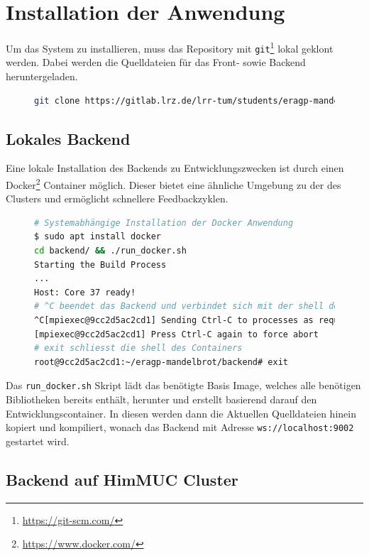 \section{Installation der Anwendung}

Um das System zu installieren, muss das Repository mit \verb|git|\footnote{\url{https://git-scm.com/}} lokal geklont werden. Dabei werden die Quelldateien für
das Front- sowie Backend heruntergeladen.

\begin{figure}[h!]
	\begin{lstlisting}[language=bash, caption={Klonen des Repositorys}]
git clone https://gitlab.lrz.de/lrr-tum/students/eragp-mandelbrot.git
        \end{lstlisting}
\end{figure}

\subsection{Lokales Backend}
Eine lokale Installation des Backends zu Entwicklungszwecken ist durch einen Docker\footnote{\url{https://www.docker.com/}} Container möglich.
Dieser bietet eine ähnliche Umgebung zu der des Clusters und ermöglicht schnellere Feedbackzyklen.

\begin{figure}[h!]
	\begin{lstlisting}[language=bash, caption={Starten der Entwicklungsumbegung des Backends}]
# Systemabhängige Installation der Docker Anwendung
$ sudo apt install docker
cd backend/ && ./run_docker.sh
Starting the Build Process
...
Host: Core 37 ready!
# ^C beendet das Backend und verbindet sich mit der shell des Containers
^C[mpiexec@9cc2d5ac2cd1] Sending Ctrl-C to processes as requested
[mpiexec@9cc2d5ac2cd1] Press Ctrl-C again to force abort
# exit schliesst die shell des Containers
root@9cc2d5ac2cd1:~/eragp-mandelbrot/backend# exit
        \end{lstlisting}
\end{figure}

Das \verb|run_docker.sh| Skript lädt das benötigte Basis Image, welches alle benötigen Bibliotheken bereits enthält, herunter und erstellt basierend darauf
den Entwicklungscontainer. In diesen werden dann die Aktuellen Quelldateien hinein kopiert und kompiliert, wonach das Backend mit Adresse
\verb|ws://localhost:9002| gestartet wird.

\subsection{Backend auf HimMUC Cluster}

